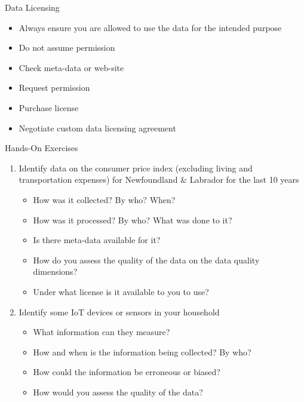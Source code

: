 \documentclass[ignorenonframetext,xcolor=x11names]{beamer}
\begin{document}
\begin{frame}{Data Licensing}
\begin{itemize}
	\item {\color{red}Always ensure you are allowed to use the data for the intended purpose}
	\item Do not assume permission
	\item Check meta-data or web-site
	\item Request permission
	\item Purchase license
	\item Negotiate custom data licensing agreement
\end{itemize}
\end{frame}

\begin{frame}{Hands-On Exercises}
\begin{enumerate}
	\item Identify data on the consumer price index (excluding living and transportation expenses) for Newfoundland \& Labrador for the last 10 years
	\begin{itemize}
		\item How was it collected? By who? When?
		\item How was it processed? By who? What was done to it?
		\item Is there meta-data available for it?
		\item How do you assess the quality of the data on the data quality dimensions?
		\item Under what license is it available to you to use?
	\end{itemize}
	\item Identify some IoT devices or sensors in your household
	\begin{itemize}
		\item What information can they measure?
		\item How and when is the information being collected? By who?
		\item How could the information be erroneous or biased?
		\item How would you assess the quality of the data?
	\end{itemize}
\end{enumerate}
\end{frame}
\end{document}
